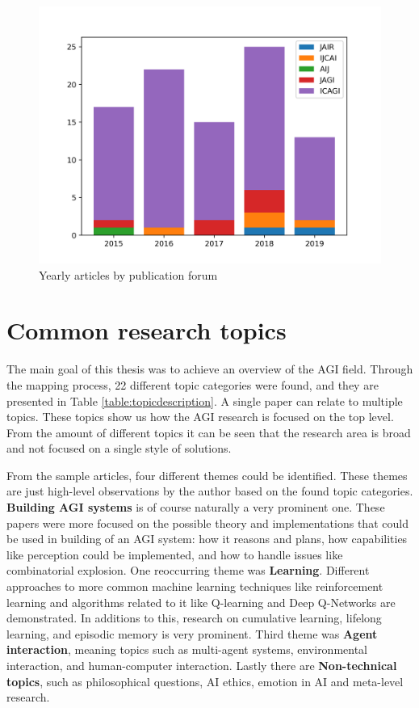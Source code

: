 \documentclass[utf8,english]{gradu3}
\begin{document}
\begin{figure}[H]
  \centering
  \includegraphics[scale=0.60]{material/data/yearly_publications.png}
  \caption{Yearly articles by publication forum}
  \label{fig:yearlybar}
\end{figure}

\section{Common research topics}

The main goal of this thesis was to achieve an overview of the AGI field.
Through the mapping process, 22 different topic categories were found, and they
are presented in Table \ref{table:topicdescription}. A single paper can relate
to multiple topics. These topics show us how the AGI research is focused on the
top level. From the amount of different topics it can be seen that the research
area is broad and not focused on a single style of solutions. 

From the sample articles, four different themes could be identified. These
themes are just high-level observations by the author based on the found topic
categories. \textbf{Building AGI systems} is of course naturally a very
prominent one. These papers were more focused on the possible theory and
implementations that could be used in building of an AGI system: how it reasons
and plans, how capabilities like perception could be implemented, and how to
handle issues like combinatorial explosion. One reoccurring theme was
\textbf{Learning}. Different approaches to more common machine learning
techniques like reinforcement learning and algorithms related to it like
Q-learning and Deep Q-Networks are demonstrated. In additions to this, research
on cumulative learning, lifelong learning, and episodic memory is very
prominent. Third theme was \textbf{Agent interaction}, meaning topics such as
multi-agent systems, environmental interaction, and human-computer interaction.
Lastly there are \textbf{Non-technical topics}, such as philosophical
questions, AI ethics, emotion in AI and meta-level research.
\end{document}
